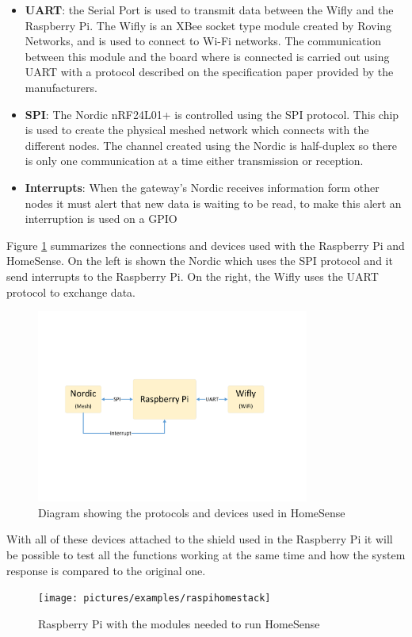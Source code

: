 \begin{itemize}
\item \textbf{UART}: the Serial Port is used to transmit data between the Wifly and the Raspberry Pi. The Wifly is an XBee socket type module created by Roving Networks, and is used to connect to Wi-Fi networks. The communication between this module and the board where is connected is carried out using UART with a protocol described on the specification paper provided by the manufacturers.

\item \textbf{SPI}: The Nordic nRF24L01+ is controlled using the SPI protocol. This chip is used to create the physical meshed network which connects with the different nodes. The channel created using the Nordic is half-duplex so there is only one communication at a time either transmission or reception.
\item \textbf{Interrupts}: When the gateway's Nordic receives information form other nodes it must alert that new data is waiting to be read, to make this alert an interruption is used on a GPIO
\end{itemize}
Figure \ref{fig:IOEx-GW-Diagram} summarizes the connections and devices used with the Raspberry Pi and HomeSense. On the left is shown the Nordic which uses the SPI protocol and it send interrupts to the Raspberry Pi. On the right, the Wifly uses the UART protocol to exchange data.
\begin{figure}[H]\begin{center}
 \centering
  \captionsetup{justification=centering}
  \includegraphics[width=0.8\textwidth]{pictures/examples/gateway-diagram}
  \caption{Diagram showing the protocols and devices used in HomeSense\label{fig:IOEx-GW-Diagram}}
\end{center}\end{figure}
With all of these devices attached to the shield used in the Raspberry Pi it will be possible to test all the functions working at the same time and how the system response is compared to the original one.
\begin{figure}[H]\begin{center}
 \centering
  \captionsetup{justification=centering}
  \texttt{[image: pictures/examples/raspihomestack]}
  \caption{Raspberry Pi with the modules needed to run HomeSense\label{fig:IOEx-HS-Stack}}
\end{center}\end{figure}

